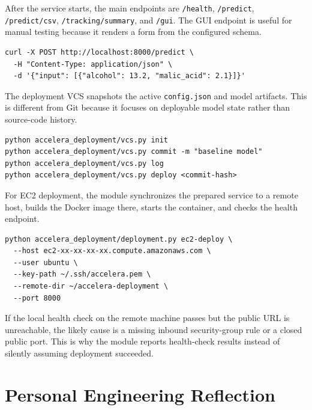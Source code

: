 \documentclass[12pt,a4paper,oneside]{report}
\newcommand{\modulepath}[1]{\texttt{#1}}
\begin{document}
After the service starts, the main endpoints are \modulepath{/health}, \modulepath{/predict}, \modulepath{/predict/csv}, \modulepath{/tracking/summary}, and \modulepath{/gui}. The GUI endpoint is useful for manual testing because it renders a form from the configured schema.

\begin{lstlisting}[style=paperpython,caption={Calling the deployed prediction endpoint}]
curl -X POST http://localhost:8000/predict \
  -H "Content-Type: application/json" \
  -d '{"input": [{"alcohol": 13.2, "malic_acid": 2.1}]}'
\end{lstlisting}

The deployment VCS snapshots the active \modulepath{config.json} and model artifacts. This is different from Git because it focuses on deployable model state rather than source-code history.

\begin{lstlisting}[style=paperpython,caption={Creating and restoring deployment snapshots}]
python accelera_deployment/vcs.py init
python accelera_deployment/vcs.py commit -m "baseline model"
python accelera_deployment/vcs.py log
python accelera_deployment/vcs.py deploy <commit-hash>
\end{lstlisting}

For EC2 deployment, the module synchronizes the prepared service to a remote host, builds the Docker image there, starts the container, and checks the health endpoint.

\begin{lstlisting}[style=paperpython,caption={Deploying the service to EC2}]
python accelera_deployment/deployment.py ec2-deploy \
  --host ec2-xx-xx-xx-xx.compute.amazonaws.com \
  --user ubuntu \
  --key-path ~/.ssh/accelera.pem \
  --remote-dir ~/accelera-deployment \
  --port 8000
\end{lstlisting}

If the local health check on the remote machine passes but the public URL is unreachable, the likely cause is a missing inbound security-group rule or a closed public port. This is why the module reports health-check results instead of silently assuming deployment succeeded.

\chapter{Personal Engineering Reflection}
\label{chap:personal-reflection}
\end{document}
